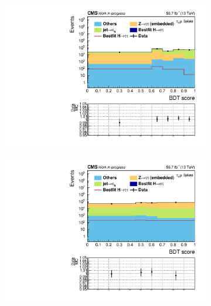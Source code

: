 \begin{figure}[!ht]
    \begin{subfigure}[b]{0.5\linewidth}
        \centering
        \includegraphics[scale=0.35]{Chapitre7/Images/histFakesdataMC2018_postfit.pdf} 
        \caption{} 
        \vspace{0.5ex}
    \end{subfigure}
    \begin{subfigure}[b]{0.5\linewidth}
        \centering
        \includegraphics[scale=0.35]{Chapitre7/Images/histZTTdataMC2018_postfit.pdf} 
        \caption{} 
        \vspace{0.5ex}
    \end{subfigure}
    \caption{}
    \label{BKGcategories}
\end{figure}


